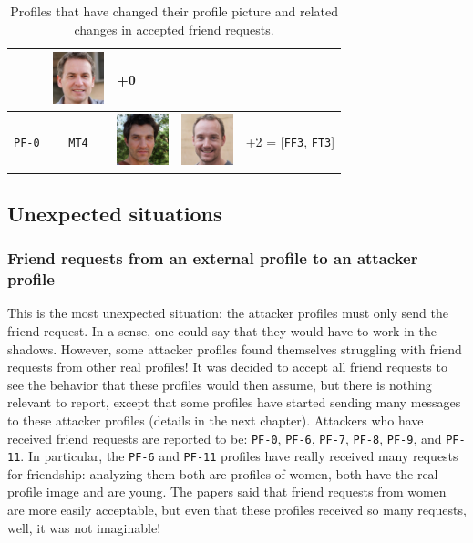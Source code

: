\begin{table}[H]
\begin{center}
\begin{tabular}[c]{ |c|c|m{1.5cm}|m{1.5cm}|c| }
	&\vspace{.15cm}	\includegraphics[height=1.5cm]{immagini/MT3-new.jpg}
	& +0 \\	 
	\hline
	\cellcolor[HTML]{b0d7ff}\texttt{PF-0}
	&\cellcolor[HTML]{e6f2ff}\texttt{MT4}
	&\vspace{.15cm}	\includegraphics[height=1.5cm]{immagini/MT4.jpg}
	&\vspace{.15cm}	\includegraphics[height=1.5cm]{immagini/MT4-new.jpg}
	&+2 = [\texttt{FF3}, \texttt{FT3}]\\
	\hline 	 	 	 	 	
\end{tabular}
\end{center}
\caption{Profiles that have changed their profile picture and related changes in accepted friend requests.}
\label{table:change-profile-pic}
\end{table}
\subsection{Unexpected situations}
\subsubsection*{Friend requests from an external profile to an attacker profile}
This is the most unexpected situation: the attacker profiles must only send the friend request. In a sense, one could say that they would have to work in the shadows. However, some attacker profiles found themselves struggling with friend requests from other real profiles! It was decided to accept all friend requests to see the behavior that these profiles would then assume, but there is nothing relevant to report, except that some profiles have started sending many messages to these attacker profiles (details in the next chapter). Attackers who have received friend requests are reported to be: \texttt{PF-0}, \texttt{PF-6}, \texttt{PF-7}, \texttt{PF-8}, \texttt{PF-9}, and \texttt{PF-11}. In particular, the \texttt{PF-6} and \texttt{PF-11} profiles have really received many requests for friendship: analyzing them both are profiles of women, both have the real profile image and are young. The papers said that friend requests from women are more easily acceptable, but even that these profiles received so many requests, well, it was not imaginable!
